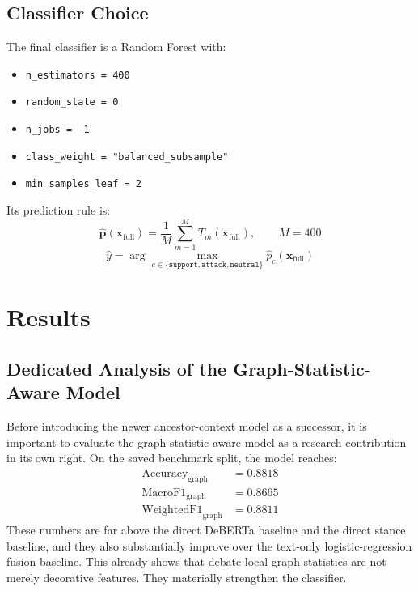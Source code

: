 \documentclass[11pt,a4paper]{article}
\begin{document}
\subsection{Classifier Choice}
The final classifier is a Random Forest with:
\begin{itemize}[leftmargin=1.5em]
  \item \texttt{n\_estimators = 400}
  \item \texttt{random\_state = 0}
  \item \texttt{n\_jobs = -1}
  \item \texttt{class\_weight = "balanced\_subsample"}
  \item \texttt{min\_samples\_leaf = 2}
\end{itemize}

Its prediction rule is:
\begin{equation}
\hat{\mathbf{p}}(\mathbf{x}_{\text{full}})
=
\frac{1}{M}\sum_{m=1}^{M} T_m(\mathbf{x}_{\text{full}}),
\qquad M=400
\end{equation}
\begin{equation}
\hat{y}
=
\arg\max_{c \in \{\texttt{support}, \texttt{attack}, \texttt{neutral}\}}
\hat{p}_c(\mathbf{x}_{\text{full}})
\end{equation}

\section{Results}
\subsection{Dedicated Analysis of the Graph-Statistic-Aware Model}
Before introducing the newer ancestor-context model as a successor, it is important to evaluate the graph-statistic-aware
model as a research contribution in its own right. On the saved benchmark split, the model reaches:
\begin{align}
\text{Accuracy}_{\mathrm{graph}} &= 0.8818 \\
\text{MacroF1}_{\mathrm{graph}} &= 0.8665 \\
\text{WeightedF1}_{\mathrm{graph}} &= 0.8811
\end{align}
These numbers are far above the direct DeBERTa baseline and the direct stance baseline, and they also substantially
improve over the text-only logistic-regression fusion baseline. This already shows that debate-local graph statistics
are not merely decorative features. They materially strengthen the classifier.
\end{document}
